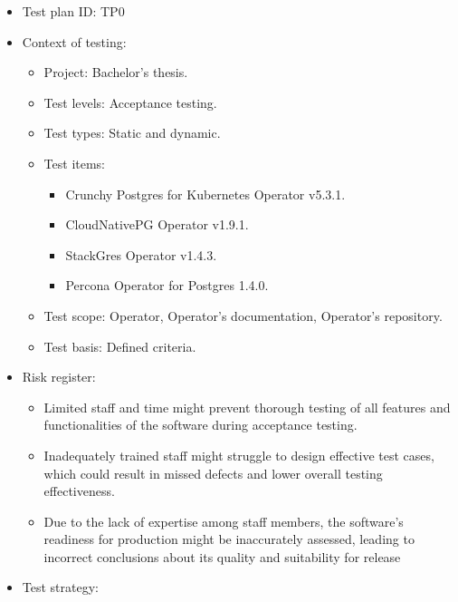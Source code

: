 




\begin{itemize}
  \item Test plan ID: TP0
  \item Context of testing:
        \begin{itemize}
          \item Project: Bachelor’s thesis.
          \item Test levels: Acceptance testing.
          \item Test types: Static and dynamic.
          \item Test items:
                \begin{itemize}
                  \item Crunchy Postgres for Kubernetes Operator v5.3.1.
                  \item CloudNativePG Operator v1.9.1.
                  \item StackGres Operator v1.4.3.
                  \item Percona Operator for Postgres 1.4.0.
                \end{itemize}
          \item Test scope: Operator, Operator’s documentation, Operator’s repository.
          \item Test basis: Defined criteria.
        \end{itemize}
  \item Risk register:
        \begin{itemize}
          \item Limited staff and time might prevent thorough testing of all features and functionalities of the software during acceptance testing.
          \item Inadequately trained staff might struggle to design effective test cases, which could result in missed defects and lower overall testing effectiveness.
          \item Due to the lack of expertise among staff members, the software's readiness for production might be inaccurately assessed, leading to incorrect conclusions about its quality and suitability for release
        \end{itemize}
  \item Test strategy:

\end{itemize}
